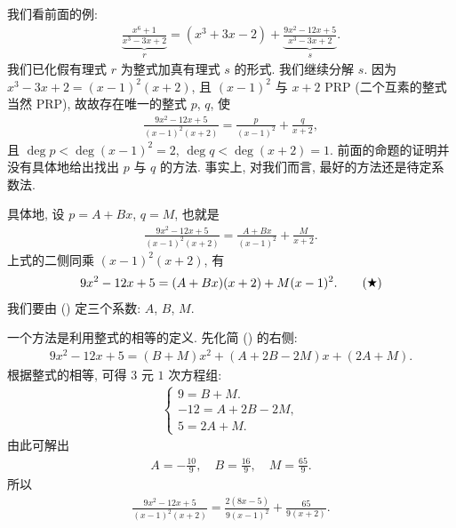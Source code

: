 \begin{example}
    我们看前面的例:
    \begin{align*}
        \underbrace{\frac{x^6 + 1}{x^3 - 3x + 2}}_{r} = (x^3 + 3x - 2) + \underbrace{\frac{9x^2 - 12x + 5}{x^3 - 3x + 2}}_{s}.
    \end{align*}
    我们已化假有理式 $r$ 为整式加真有理式 $s$ 的形式. 我们继续分解 $s$. 因为 $x^3 - 3x + 2 = (x - 1)^2 (x + 2)$, 且 $(x - 1)^2$ 与 $x + 2$ PRP (二个互素的整式当然 PRP), 故故存在唯一的整式 $p$, $q$, 使
    \begin{align*}
        \frac{9x^2 - 12x + 5}{(x - 1)^2 (x + 2)} = \frac{p}{(x - 1)^2} + \frac{q}{x + 2},
    \end{align*}
    且 $\deg p < \deg {(x - 1)^2} = 2$, $\deg q < \deg {(x + 2)} = 1$. 前面的命题的证明并没有具体地给出找出 $p$ 与 $q$ 的方法. 事实上, 对我们而言, 最好的方法还是待定系数法.

    具体地, 设 $p = A + Bx$, $q = M$, 也就是
    \begin{align*}
        \frac{9x^2 - 12x + 5}{(x - 1)^2 (x + 2)} = \frac{A + Bx}{(x - 1)^2} + \frac{M}{x + 2}.
    \end{align*}
    上式的二侧同乘 $(x - 1)^2 (x + 2)$, 有
    \begin{align*}
        9x^2 - 12x + 5 = (A + Bx) (x + 2) + M (x - 1)^2. \tag*{(\ding{72})}
    \end{align*}
    我们要由 () 定三个系数: $A$, $B$, $M$.

    一个方法是利用整式的相等的定义. 先化简 () 的右侧:
    \begin{align*}
        9x^2 - 12x + 5 = (B + M) x^2 + (A + 2B - 2M) x + (2A + M).
    \end{align*}
    根据整式的相等, 可得 $3$ 元 $1$ 次方程组:
    \begin{align*}
        \begin{cases}
            9 = B + M.         \\
            -12 = A + 2B - 2M, \\
            5 = 2A + M.
        \end{cases}
    \end{align*}
    由此可解出
    \begin{align*}
        A = -\frac{10}{9}, \quad B = \frac{16}{9}, \quad M = \frac{65}{9}.
    \end{align*}
    所以
    \begin{align*}
        \frac{9x^2 - 12x + 5}{(x - 1)^2 (x + 2)} = \frac{2(8x - 5)}{9(x - 1)^2} + \frac{65}{9(x + 2)}.
    \end{align*}


\end{example}
